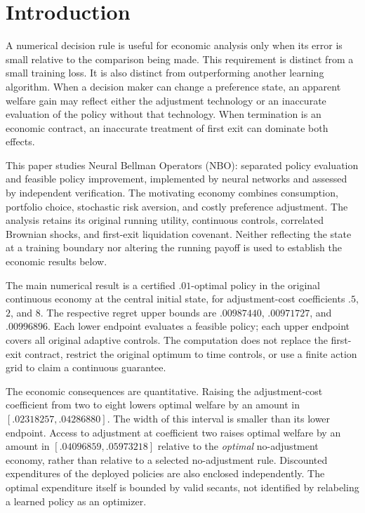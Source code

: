 \section{Introduction}
A numerical decision rule is useful for economic analysis only when its error is small relative to the comparison being made. This requirement is distinct from a small training loss. It is also distinct from outperforming another learning algorithm. When a decision maker can change a preference state, an apparent welfare gain may reflect either the adjustment technology or an inaccurate evaluation of the policy without that technology. When termination is an economic contract, an inaccurate treatment of first exit can dominate both effects.

This paper studies Neural Bellman Operators (NBO): separated policy evaluation and feasible policy improvement, implemented by neural networks and assessed by independent verification. The motivating economy combines consumption, portfolio choice, stochastic risk aversion, and costly preference adjustment. The analysis retains its original running utility, continuous controls, correlated Brownian shocks, and first-exit liquidation covenant. Neither reflecting the state at a training boundary nor altering the running payoff is used to establish the economic results below.

The main numerical result is a certified $.01$-optimal policy in the original continuous economy at the central initial state, for adjustment-cost coefficients $.5$, $2$, and $8$. The respective regret upper bounds are $.00987440$, $.00971727$, and $.00996896$. Each lower endpoint evaluates a feasible policy; each upper endpoint covers all original adaptive controls. The computation does not replace the first-exit contract, restrict the original optimum to time controls, or use a finite action grid to claim a continuous guarantee.

The economic consequences are quantitative. Raising the adjustment-cost coefficient from two to eight lowers optimal welfare by an amount in $[.02318257,.04286880]$. The width of this interval is smaller than its lower endpoint. Access to adjustment at coefficient two raises optimal welfare by an amount in $[.04096859,.05973218]$ relative to the \emph{optimal} no-adjustment economy, rather than relative to a selected no-adjustment rule. Discounted expenditures of the deployed policies are also enclosed independently. The optimal expenditure itself is bounded by valid secants, not identified by relabeling a learned policy as an optimizer.


